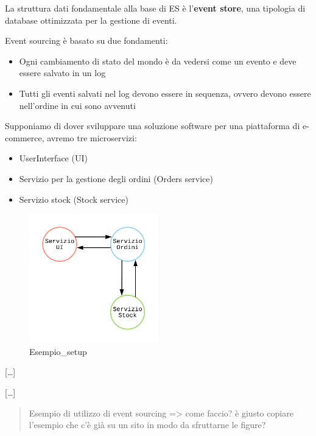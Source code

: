 \documentclass[]{article}
\providecommand{\tightlist}{%
  \setlength{\itemsep}{0pt}\setlength{\parskip}{0pt}}
\begin{document}
La struttura dati fondamentale alla base di ES è l'\textbf{event store},
una tipologia di database ottimizzata per la gestione di eventi.

Event sourcing è basato su due fondamenti:

\begin{itemize}
\tightlist
\item
  Ogni cambiamento di stato del mondo è da vedersi come un evento e deve
  essere salvato in un log
\item
  Tutti gli eventi salvati nel log devono essere in sequenza, ovvero
  devono essere nell'ordine in cui sono avvenuti
\end{itemize}

Supponiamo di dover sviluppare una soluzione software per una
piattaforma di e-commerce, avremo tre microservizi:

\begin{itemize}
\tightlist
\item
  UserInterface (UI)
\item
  Servizio per la gestione degli ordini (Orders service)
\item
  Servizio stock (Stock service)
\end{itemize}

\begin{figure}
\centering
\includegraphics[width=0.50000\textwidth]{../images/figure1.png}
\caption{Esempio\_setup \label{figure_1}}
\end{figure}

{[}\ldots{}{]}

{[}\ldots{}{]}

\begin{quote}
Esempio di utilizzo di event sourcing =\textgreater{} come faccio? è
giusto copiare l'esempio che c'è già su un sito in modo da sfruttarne le
figure?
\end{quote}
\end{document}

